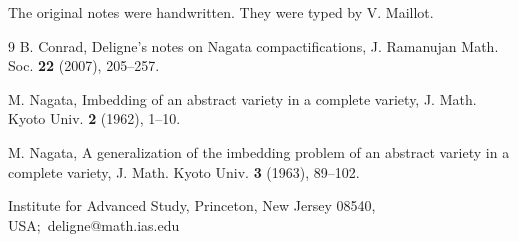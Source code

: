 \documentclass[11pt,a4paper]{article}
\theoremstyle{plain}
\theoremstyle{definition}
\begin{document}
The original notes were handwritten. They were typed by V. Maillot.

\begin{thebibliography}{9}
B. Conrad, Deligne's notes on Nagata compactifications, J. Ramanujan Math. Soc. \textbf{22} (2007), 205--257.

M. Nagata, Imbedding of an abstract variety in a complete variety, J. Math. Kyoto Univ. \textbf{2} (1962), 1--10.

M. Nagata, A generalization of the imbedding problem of an abstract variety in a complete variety, J. Math. Kyoto Univ. \textbf{3} (1963), 89--102.
\end{thebibliography}

\bigskip
\noindent Institute for Advanced Study, Princeton, New Jersey 08540, USA;\
deligne@math.ias.edu
\end{document}
